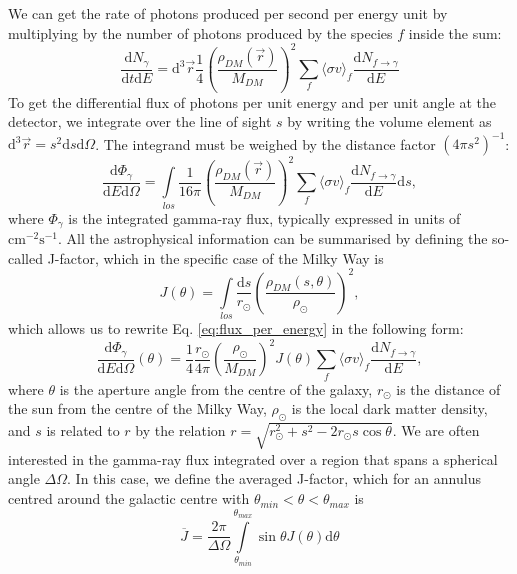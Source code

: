 We can get the rate of photons produced per second per energy unit by multiplying by the number of photons produced by the species \(f\) inside the sum:
\begin{equation}
	\frac{\mathrm{d}N_{\gamma } }{\mathrm{d}t \mathrm{d} E} = \mathrm{d} ^3 \vec{r} \frac{1}{4} \left( \frac{\rho_{DM} (\vec{r})}{M_{DM} } \right)^2 \sum_{f} \langle \sigma v \rangle_f \frac{\mathrm{d}N_{f \to \gamma } }{\mathrm{d}E}
\end{equation}
To get the differential flux of photons per unit energy and per unit angle at the detector, we integrate over the line of sight \(s\) by writing the volume element as \(\mathrm{d} ^3 \vec{r}= s^2 \mathrm{d} s \mathrm{d} \Omega \). The integrand must be weighed by the distance factor \((4\pi s^2)^{-1} \):
\begin{equation}\label{eq:flux_per_energy}
	\frac{\mathrm{d}\Phi_{\gamma } }{\mathrm{d}E \mathrm{d} \Omega } = \int\limits_{los} \frac{1}{16\pi }\left( \frac{\rho_{DM} (\vec{r})}{M_{DM} } \right)^2 \sum_{f} \langle \sigma v \rangle _f \frac{\mathrm{d}N_{f\to \gamma } }{\mathrm{d}E} \mathrm{d} s,
\end{equation}
where \(\Phi_{\gamma } \) is the integrated gamma-ray flux, typically expressed in units of \(\mathrm{cm^{-2} s^{-1} } \). All the astrophysical information can be summarised by defining the so-called J-factor, which in the specific case of the Milky Way is
\begin{equation}
	J(\theta ) = \int\limits_{los} \frac{\mathrm{d}s}{r_\odot} \left( \frac{\rho_{DM} (s, \theta )}{\rho_\odot} \right)^2,
\end{equation}
which allows us to rewrite Eq. \eqref{eq:flux_per_energy} in the following form:
\begin{equation}
	\frac{\mathrm{d}\Phi_{\gamma } }{\mathrm{d}E \mathrm{d} \Omega }(\theta ) = \frac{1}{4} \frac{r_\odot}{4\pi }\left( \frac{\rho_\odot}{M_{DM} } \right)^2 J (\theta ) \sum_{f}  \langle \sigma v \rangle _f \frac{\mathrm{d}N_{f\to \gamma } }{\mathrm{d}E}, 
\end{equation}
where \(\theta \) is the aperture angle from the centre of the galaxy, \(r_\odot\) is the distance of the sun from the centre of the Milky Way, \(\rho_\odot\) is the local dark matter density, and \(s\) is related to \(r\) by the relation \(r=\sqrt{r_\odot^2 + s^2 - 2 r_\odot s \cos \theta } \). We are often interested in the gamma-ray flux integrated over a region that spans a spherical angle \(\Delta \Omega \). In this case, we define the averaged J-factor, which for an annulus centred around the galactic centre with \(\theta_{min }< \theta < \theta_{max} \) is \cite{Cirelli_2024}
\begin{equation}
	\overline{J} = \frac{2\pi }{\Delta \Omega } \int\limits_{\theta_{min}}^{\theta_{max} }\sin \theta J(\theta ) \mathrm{d} \theta 
\end{equation}

